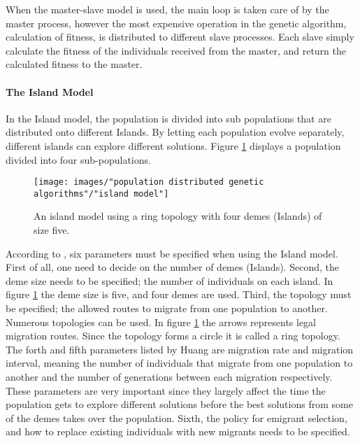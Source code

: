 \noindent When the master-slave model is used, the main loop is taken care of by the master process, however the most expensive operation in the genetic algorithm, calculation of fitness, is distributed to different slave processes. Each slave simply calculate the fitness of the individuals received from the master, and return the calculated fitness to the master. 


\paragraph*{The Island Model}
In the Island model, the population is divided into sub populations that are distributed onto different Islands. By letting each population evolve separately, different islands can explore different solutions. Figure \ref{Island model} displays a population divided into four sub-populations. \\ 


\begin{figure}[h!]
\begin{center}
\texttt{[image: images/"population distributed genetic algorithms"/"island model"]}
\caption{An island model using a ring topology with four demes (Islands) of size five. \citep{Gong}}
\label{Island model}
\end{center}
\end{figure}


\noindent According to \cite{Huang}, six parameters must be specified when using the Island model. First of all, one need to decide on the number of demes (Islands). Second, the deme size needs to be specified; the number of individuals on each island. In figure \ref{Island model} the deme size is five, and four demes are used. Third, the topology must be specified; the allowed routes to migrate from one population to another. Numerous topologies can be used. In figure \ref{Island model} the arrows represents legal migration routes. Since the topology forms a circle it is called a ring topology. The forth and fifth parameters listed by Huang are migration rate and migration interval, meaning the number of individuals that migrate from one population to another and the number of generations between each migration respectively. These parameters are very important since they largely affect the time the population gets to explore different solutions before the best solutions from some of the demes takes over the population. Sixth, the policy for emigrant selection, and how to replace existing individuals with new migrants needs to be specified. \\


